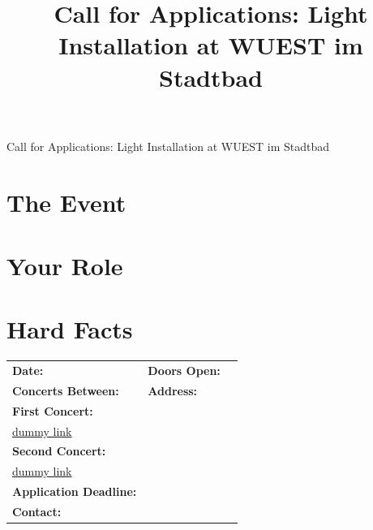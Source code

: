 \documentclass[a4paper, 11pt]{memoir}
\title{Call for Applications: Light Installation at WUEST im Stadtbad}
\date{}
\begin{document}
    \pagestyle{empty}

    \begin{center}
        \Huge{Call for Applications: Light Installation at WUEST im Stadtbad}
    \end{center}


    \section*{The Event}

    \section*{Your Role}

    \section*{Hard Facts}

    \begin{tabularx}{\textwidth}{lXr}

        \textbf{Date:} & \textbf{Doors Open:} \\
        \textbf{Concerts Between:} & \textbf{Address:} \\
        \textbf{First Concert:} \\
        \href{www.duckduckgo.com}{dummy link} \\
        \textbf{Second Concert:} \\
        \href{www.duckduckgo.com}{dummy link} \\
        \textbf{Application Deadline:} \\
        \textbf{Contact:} \\


    \end{tabularx}
\end{document}
